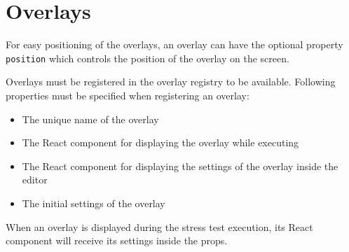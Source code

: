\section{Overlays}
\label{sec:overlays}

For easy positioning of the overlays, an overlay can have the optional property \texttt{position} which controls the position of the overlay on the screen.

Overlays must be registered in the overlay registry to be available.
Following properties must be specified when registering an overlay:
\begin{itemize}
  \item The unique name of the overlay
  \item The React component for displaying the overlay while executing
  \item The React component for displaying the settings of the overlay inside the editor
  \item The initial settings of the overlay
\end{itemize}

When an overlay is displayed during the stress test execution, its React component will receive its settings inside the props.
